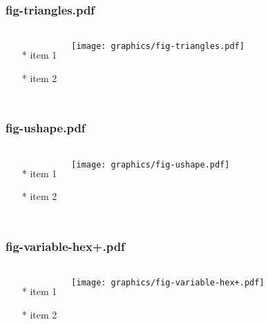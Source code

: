 \begin{frame} \frametitle{fig-triangles.pdf}
    \begin{columns}[c]
        \begin{itemize}
            \item[*] item 1
            \item[*] item 2
        \end{itemize}
        \begin{minipage}{\linewidth}
            \begin{center}
            \texttt{[image: graphics/fig-triangles.pdf]}
            \label{gfx:fig-triangles.pdf}
            \end{center}
        \end{minipage}
    \end{columns}
\end{frame}
\begin{frame} \frametitle{fig-ushape.pdf}
    \begin{columns}[c]
        \begin{itemize}
            \item[*] item 1
            \item[*] item 2
        \end{itemize}
        \begin{minipage}{\linewidth}
            \begin{center}
            \texttt{[image: graphics/fig-ushape.pdf]}
            \label{gfx:fig-ushape.pdf}
            \end{center}
        \end{minipage}
    \end{columns}
\end{frame}
\begin{frame} \frametitle{fig-variable-hex+.pdf}
    \begin{columns}[c]
        \begin{itemize}
            \item[*] item 1
            \item[*] item 2
        \end{itemize}
        \begin{minipage}{\linewidth}
            \begin{center}
            \texttt{[image: graphics/fig-variable-hex+.pdf]}
            \label{gfx:fig-variable-hex+.pdf}
            \end{center}
        \end{minipage}
    \end{columns}
\end{frame}
